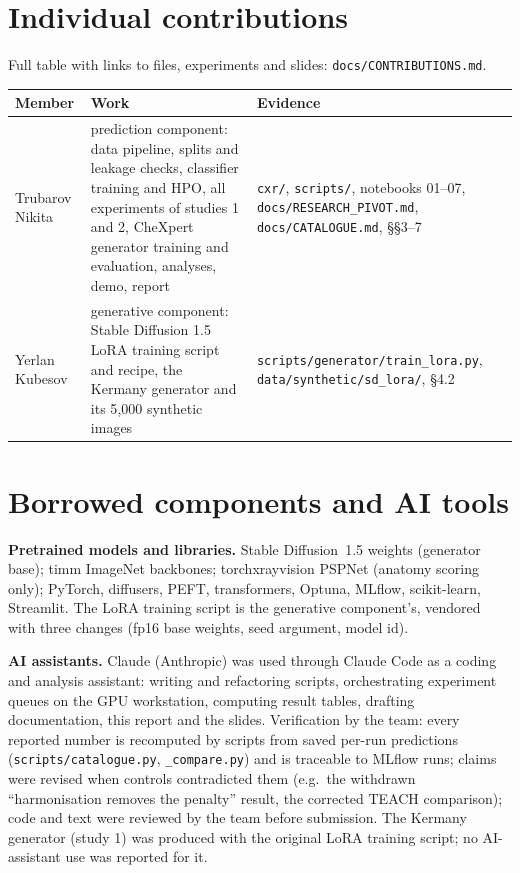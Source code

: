 \documentclass[11pt,a4paper]{article}
\newcommand{\code}[1]{\texttt{\small #1}}
\begin{document}
\section{Individual contributions}
Full table with links to files, experiments and slides: \code{docs/CONTRIBUTIONS.md}.

\begin{table}[h]\centering\small
\begin{tabularx}{\textwidth}{lYY}\toprule
Member & Work & Evidence\\\midrule
Trubarov Nikita & prediction component: data pipeline, splits and leakage checks, classifier training and HPO, all experiments of studies 1 and 2, CheXpert generator training and evaluation, analyses, demo, report & \code{cxr/\allowbreak{}}, \code{scripts/\allowbreak{}}, notebooks 01--07, \code{docs/\allowbreak{}RESEARCH\_\allowbreak{}PIVOT.md}, \code{docs/\allowbreak{}CATALOGUE.md}, \S\S3--7\\
Yerlan Kubesov & generative component: Stable Diffusion 1.5 LoRA training script and recipe, the Kermany generator and its 5{,}000 synthetic images & \code{scripts/\allowbreak{}generator/\allowbreak{}train\_\allowbreak{}lora.py}, \code{data/\allowbreak{}synthetic/\allowbreak{}sd\_\allowbreak{}lora/\allowbreak{}}, \S4.2\\\bottomrule
\end{tabularx}
\end{table}

\appendix
\section{Borrowed components and AI tools}
\textbf{Pretrained models and libraries.} Stable Diffusion~1.5 weights (generator base); timm ImageNet backbones; torchxrayvision PSPNet (anatomy scoring only); PyTorch, diffusers, PEFT, transformers, Optuna, MLflow, scikit-learn, Streamlit. The LoRA training script is the generative component's, vendored with three changes (fp16 base weights, seed argument, model id).

\textbf{AI assistants.} Claude (Anthropic) was used through Claude Code as a coding and analysis assistant: writing and refactoring scripts, orchestrating experiment queues on the GPU workstation, computing result tables, drafting documentation, this report and the slides. Verification by the team: every reported number is recomputed by scripts from saved per-run predictions (\code{scripts/\allowbreak{}catalogue.py}, \code{*\_\allowbreak{}compare.py}) and is traceable to MLflow runs; claims were revised when controls contradicted them (e.g.\ the withdrawn ``harmonisation removes the penalty'' result, the corrected TEACH comparison); code and text were reviewed by the team before submission. The Kermany generator (study 1) was produced with the original LoRA training script; no AI-assistant use was reported for it.
\end{document}
